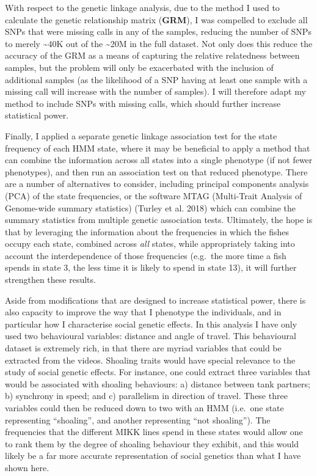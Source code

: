 \documentclass[
]{book}
\begin{document}
With respect to the genetic linkage analysis, due to the method I used to calculate the genetic relationship matrix (\textbf{GRM}), I was compelled to exclude all SNPs that were missing calls in any of the samples, reducing the number of SNPs to merely \textasciitilde40K out of the \textasciitilde20M in the full dataset. Not only does this reduce the accuracy of the GRM as a means of capturing the relative relatedness between samples, but the problem will only be exacerbated with the inclusion of additional samples (as the likelihood of a SNP having at least one sample with a missing call will increase with the number of samples). I will therefore adapt my method to include SNPs with missing calls, which should further increase statistical power.

Finally, I applied a separate genetic linkage association test for the state frequency of each HMM state, where it may be beneficial to apply a method that can combine the information across all states into a single phenotype (if not fewer phenotypes), and then run an association test on that reduced phenotype. There are a number of alternatives to consider, including principal components analysis (PCA) of the state frequencies, or the software MTAG (Multi-Trait Analysis of Genome-wide summary statistics) (Turley et al. 2018) which can combine the summary statistics from multiple genetic association tests. Ultimately, the hope is that by leveraging the information about the frequencies in which the fishes occupy each state, combined across \emph{all} states, while appropriately taking into account the interdependence of those frequencies (e.g.~the more time a fish spends in state 3, the less time it is likely to spend in state 13), it will further strengthen these results.

Aside from modifications that are designed to increase statistical power, there is also capacity to improve the way that I phenotype the individuals, and in particular how I characterise social genetic effects. In this analysis I have only used two behavioural variables: distance and angle of travel. This behavioural dataset is extremely rich, in that there are myriad variables that could be extracted from the videos. Shoaling traits would have special relevance to the study of social genetic effects. For instance, one could extract three variables that would be associated with shoaling behaviours: a) distance between tank partners; b) synchrony in speed; and c) parallelism in direction of travel. These three variables could then be reduced down to two with an HMM (i.e.~one state representing ``shoaling'', and another representing ``not shoaling''). The frequencies that the different MIKK lines spend in these states would allow one to rank them by the degree of shoaling behaviour they exhibit, and this would likely be a far more accurate representation of social genetics than what I have shown here.
\end{document}
